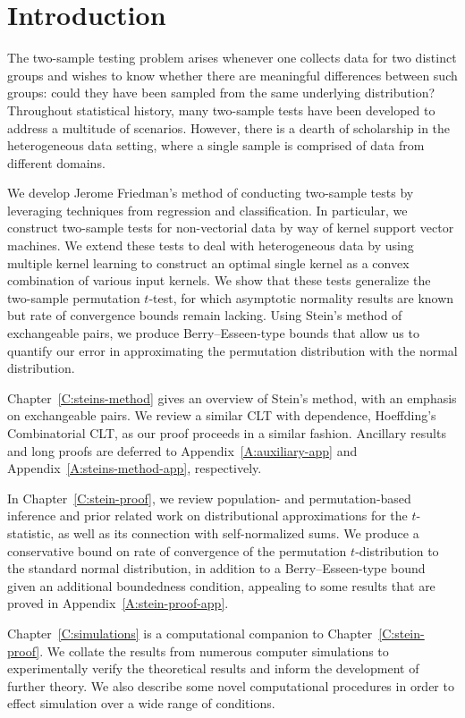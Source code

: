 \chapter{Introduction}

The two-sample testing problem arises whenever one collects data for
two distinct groups and wishes to know whether there are meaningful
differences between such groups: could they have been sampled from the
same underlying distribution?  Throughout statistical history, many
two-sample tests have been developed to address a multitude of
scenarios.  However, there is a dearth of scholarship in the
heterogeneous data setting, where a single sample is comprised of data
from different domains.

We develop Jerome Friedman's method of conducting two-sample tests
by leveraging techniques from regression and classification.  In
particular, we construct two-sample tests for non-vectorial data by
way of kernel support vector machines.  We extend these tests to deal
with heterogeneous data by using multiple kernel learning to construct
an optimal single kernel as a convex combination of various input
kernels.  We show that these tests generalize the two-sample permutation
$t$-test, for which asymptotic normality results are known but rate of
convergence bounds remain lacking.  Using Stein's method of
exchangeable pairs, we produce Berry--Esseen-type bounds that allow us
to quantify our error in approximating the permutation distribution
with the normal distribution.

Chapter~\ref{C:steins-method} gives an overview of Stein's method,
with an emphasis on exchangeable pairs.  We review a similar CLT with
dependence, Hoeffding's Combinatorial CLT, as our proof proceeds in a
similar fashion.  Ancillary results and long proofs are deferred to
Appendix~\ref{A:auxiliary-app} and Appendix~\ref{A:steins-method-app},
respectively.

In Chapter~\ref{C:stein-proof}, we review population- and
permutation-based inference and prior related work on distributional
approximations for the $t$-statistic, as well as its connection with
self-normalized sums.  We produce a conservative bound on rate of
convergence of the permutation $t$-distribution to the standard normal
distribution, in addition to a Berry--Esseen-type bound given an
additional boundedness condition, appealing to some results that are
proved in Appendix~\ref{A:stein-proof-app}.

Chapter~\ref{C:simulations} is a computational companion to
Chapter~\ref{C:stein-proof}.  We collate the results from numerous
computer simulations to experimentally verify the theoretical results
and inform the development of further theory.  We also describe some
novel computational procedures in order to effect simulation over a
wide range of conditions.

